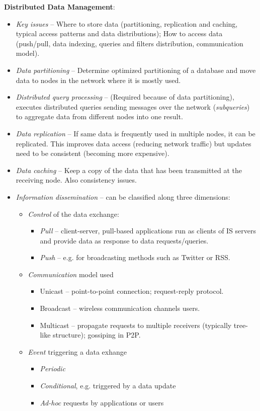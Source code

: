 \textbf{Distributed Data Management}:
\begin{itemize}
	\item \emph{Key issues} -- Where to store data (partitioning, replication and caching, typical access patterns and data distributions); How to access data (push/pull, data indexing, queries and filters distribution, communication model).
	\item \emph{Data partitioning} -- Determine optimized partitioning of a database and move data to nodes in the network where it is mostly used.
	\item \emph{Distributed query processing} -- (Required because of data partitioning), executes distributed queries sending messages over the network (\emph{subqueries}) to aggregate data from different nodes into one result.
	\item \emph{Data replication} -- If same data is frequently used in multiple nodes, it can be replicated. This improves data access (reducing network traffic) but updates need to be consistent (becoming more expensive).
	\item \emph{Data caching} -- Keep a copy of the data that has been transmitted at the receiving node. Also consistency issues.
	\item \emph{Information dissemination} -- can be classified along three dimensions:
	\begin{itemize}
		\item \emph{Control} of the data exchange:
		\begin{itemize}
			\item \emph{Pull} -- client-server, pull-based applications run as clients of IS servers and provide data as response to data requests/queries. %
			\item \emph{Push} -- e.g. for broadcasting methods such as Twitter or RSS. %
		\end{itemize}
		\item \emph{Communication} model used
		\begin{itemize}
			\item Unicast -- point-to-point connection; request-reply protocol.
			\item Broadcast -- wireless communication channels users.
			\item Multicast -- propagate requests to multiple receivers (typically tree-like structure); gossiping in P2P.
		\end{itemize}
		\item \emph{Event} triggering a data exhange
		\begin{itemize}
			\item \emph{Periodic}
			\item \emph{Conditional}, e.g. triggered by a data update
			\item \emph{Ad-hoc} requests by applications or users
		\end{itemize}
	\end{itemize}
\end{itemize}

